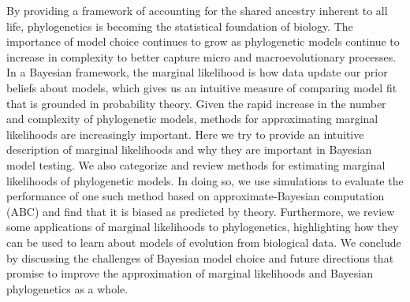 By providing a framework of accounting for the shared ancestry inherent to all
life,
phylogenetics is becoming the statistical foundation of biology.
The importance of model choice continues to grow as phylogenetic models
continue to increase in complexity to better capture micro and
macroevolutionary processes.
In a Bayesian framework, 
the marginal likelihood is how data update our prior beliefs about models,
which gives us an intuitive measure of comparing model fit that is grounded in
probability theory.
Given the rapid increase in the number and complexity of phylogenetic models,
methods for approximating marginal likelihoods are increasingly important.
Here we try to provide an intuitive description of marginal likelihoods and why
they are important in Bayesian model testing.
We also categorize and review methods for estimating marginal likelihoods of
phylogenetic models.
In doing so, we use simulations to evaluate the performance of one such method
based on approximate-Bayesian computation (ABC) and find that it is biased as
predicted by theory.
Furthermore, we review some applications of marginal likelihoods to
phylogenetics, highlighting how they can be used to learn about models of
evolution from biological data.
We conclude by discussing the challenges of Bayesian model choice and future
directions that promise to improve the approximation of marginal likelihoods
and Bayesian phylogenetics as a whole.
